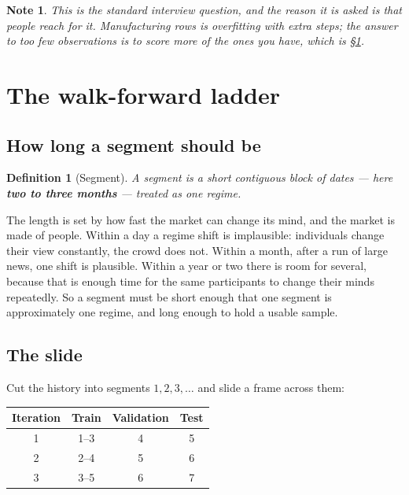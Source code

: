 \documentclass[11pt]{article}
\theoremstyle{runin}
\newtheorem*{definition}{Definition}
\newtheorem*{note}{Note}
\begin{document}
\begin{note}
This is the standard interview question, and the reason it is asked is that people reach for it.
Manufacturing rows is overfitting with extra steps; the answer to too few observations is to score
more of the ones you have, which is \S\ref{sec:ladder}.
\end{note}

\section{The walk-forward ladder}
\label{sec:ladder}

\subsection{How long a segment should be}

\begin{definition}[Segment]
A \emph{segment} is a short contiguous block of dates --- here \textbf{two to three months} ---
treated as one regime.
\end{definition}

The length is set by how fast the market can change its mind, and the market is made of people.
Within a day a regime shift is implausible: individuals change their view constantly, the crowd
does not. Within a month, after a run of large news, one shift is plausible. Within a year or two
there is room for several, because that is enough time for the same participants to change their
minds repeatedly. So a segment must be short enough that one segment is approximately one regime,
and long enough to hold a usable sample.

\subsection{The slide}

Cut the history into segments $1, 2, 3, \ldots$ and slide a frame across them:

\begin{center}
\begin{tabular}{@{}cccc@{}}
\toprule
\textbf{Iteration} & \textbf{Train} & \textbf{Validation} & \textbf{Test} \\
\midrule
1 & 1--3 & 4 & 5 \\
2 & 2--4 & 5 & 6 \\
3 & 3--5 & 6 & 7 \\
\bottomrule
\end{tabular}
\end{center}
\end{document}
